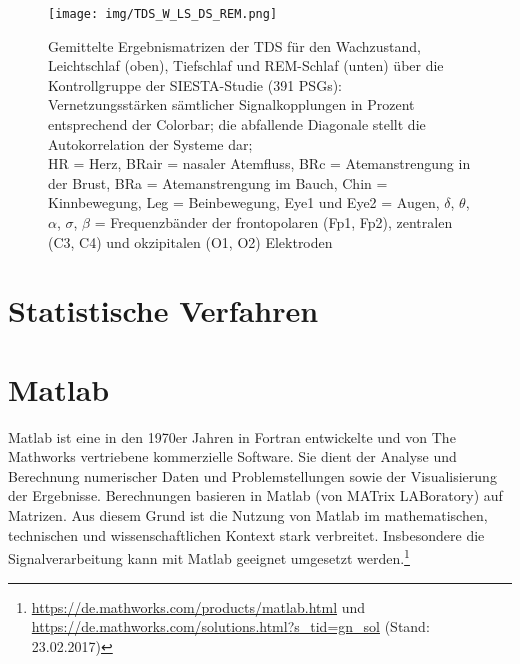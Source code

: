 \begin{figure}[H]
	\centering
	\texttt{[image: img/TDS\_W\_LS\_DS\_REM.png]}
	\caption[Ergebnismatrizen der \acs{TDS}]{Gemittelte Ergebnismatrizen der \acs{TDS} für den Wachzustand, Leichtschlaf (oben), Tiefschlaf und \acs{REM}-Schlaf (unten) über die Kontrollgruppe der SIESTA-Studie (391 \acs{PSG}s):\\Vernetzungsstärken sämtlicher Signalkopplungen in Prozent entsprechend der Colorbar; die abfallende Diagonale stellt die Autokorrelation der Systeme dar;\\HR = Herz, BRair = nasaler Atemfluss, BRc = Atemanstrengung in der Brust, BRa = Atemanstrengung im Bauch, Chin = Kinnbewegung, Leg = Beinbewegung, Eye1 und Eye2 = Augen, $\delta$, $\theta$, $\alpha$, $\sigma$, $\beta$ = Frequenzbänder der frontopolaren (Fp1, Fp2), zentralen (C3, C4) und okzipitalen (O1, O2) Elektroden}
	\label{fig:TDS_Matrizen}
\end{figure}

\newpage

\section{Statistische Verfahren}

\section{Matlab}

Matlab ist eine in den 1970er Jahren in Fortran entwickelte und von The Mathworks vertriebene kommerzielle Software. Sie dient der Analyse und Berechnung numerischer Daten und Problemstellungen sowie der Visualisierung der Ergebnisse. Berechnungen basieren in Matlab (von MATrix LABoratory) auf Matrizen. Aus diesem Grund ist die Nutzung von Matlab im mathematischen, technischen und wissenschaftlichen Kontext stark verbreitet. Insbesondere die Signalverarbeitung kann mit Matlab geeignet umgesetzt werden.\footnote{\url{https://de.mathworks.com/products/matlab.html} und \url{https://de.mathworks.com/solutions.html?s_tid=gn_sol} (Stand: 23.02.2017)}\\

